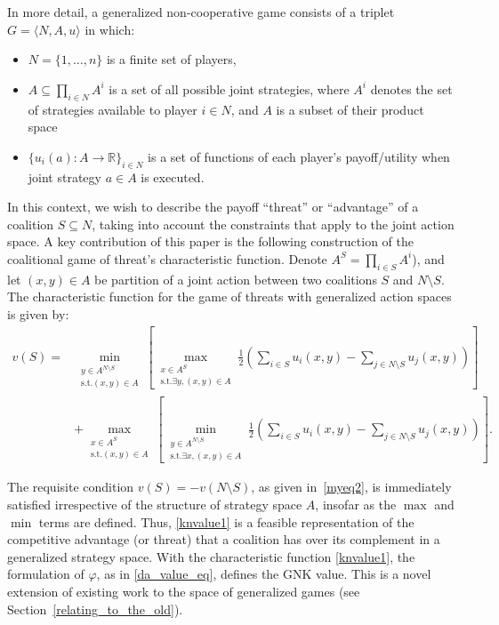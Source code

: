In more detail, a generalized non-cooperative game consists of a triplet $G = \langle N,A,u \rangle$ in which:
\begin{itemize}
\item	$N=\{1,\dots,n\}$ is a finite set of players,
\item	$A\subseteq \prod_{i\in N}A^i$ is a set of all possible joint strategies, where $A^i$ denotes the set of strategies available to player $i\in N$, and $A$ is a subset of their product space
\item	$\{u_i(a) : A\rightarrow \mathbb{R}\}_{i\in N}$ is a set of functions of each player's payoff/utility when joint strategy $a\in A$ is executed.
\end{itemize}

In this context, we wish to describe the payoff ``threat'' or ``advantage'' of a coalition $S\subseteq N$, taking into account the constraints that apply to the joint action space.  
A key contribution of this paper is the following construction of the coalitional game of threat's characteristic function. 
Denote $A^S=\prod_{i\in S}A^i$), 
and let $(x,y)\in A$ be partition of a joint action between two coalitions $S$ and $N\setminus S$. 
The characteristic function for the game of threats with generalized action spaces is given by:
\begin{align}
\label{knvalue1}
v(S) = &
\min_{\substack{y\in A^{N\setminus S} \\ \text{s.t.}(x,y)\in A}} \left[
\max_{\substack{x\in A^S \\ \text{s.t.}\exists y,(x,y)\in A}}
	\frac{1}{2}\left(\sum_{i\in S} u_i(x,y) - \sum_{j\in N\setminus S}u_j(x,y)\right)\right]\nonumber\\
& +
\max_{\substack{x\in A^S \\ \text{s.t.}(x,y)\in A}} \left[
\min_{\substack{y\in A^{N\setminus S} \\ \text{s.t.}\exists x,(x,y)\in A}}
	\frac{1}{2}\left(\sum_{i\in S} u_i(x,y) - \sum_{j\in N\setminus S} u_j(x,y) \right) \right].
\end{align}

The requisite condition $v(S)=-v(N\setminus S)$, as given in~\eqref{myeq2}, is immediately satisfied irrespective of the structure of strategy space $A$, insofar as the $\max$ and $\min$ terms are defined.
Thus, \eqref{knvalue1} is a feasible representation of the competitive advantage (or threat) that a coalition has over its complement in a generalized strategy space.
With the characteristic function \eqref{knvalue1}, the formulation of $\varphi$, as in \eqref{da_value_eq}, defines the GNK value.
This is a novel extension of existing work to the space of generalized games (see Section~\ref{relating_to_the_old}).

